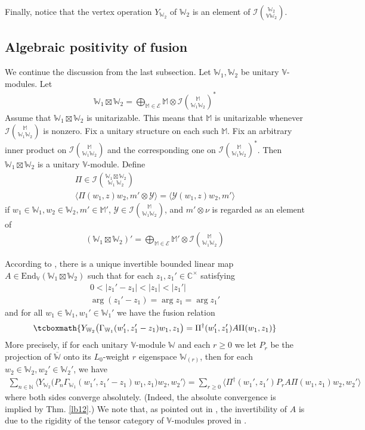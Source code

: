 \documentclass[11pt,b5paper,notitlepage]{article}
\theoremstyle{definition}
\theoremstyle{plain}
\newcommand{\mc}{\mathcal}
\newcommand{\ovl}{\overline}
\newcommand{\End}{\mathrm{End}} %
\newcommand{\bk}[1]{\langle {#1}\rangle}
\newcommand{\bigbk}[1]{\big\langle {#1}\big\rangle}
\newcommand{\Vbb}{\mathbb V}
\newcommand{\Wbb}{\mathbb W}
\newcommand{\Mbb}{\mathbb M}
\newcommand{\Cbb}{\mathbb C}
\newcommand{\Nbb}{\mathbb N}
\numberwithin{equation}{section}
\begin{document}
Finally, notice that the vertex operation $Y_{\Wbb_2}$ of $\Wbb_2$ is an element of $\mc I{\Wbb_2\choose \Vbb\Wbb_2}$.


\subsection{Algebraic positivity of fusion}


We continue the discussion from the last subsection. Let $\Wbb_1,\Wbb_2$ be unitary $\Vbb$-modules. Let
\begin{align*}
\Wbb_1\boxtimes\Wbb_2=\bigoplus_{\Mbb\in\mc E}\Mbb\otimes\mc I{\Mbb\choose\Wbb_1\Wbb_2}^*
\end{align*}
Assume that $\Wbb_1\boxtimes\Wbb_2$ is unitarizable. This means that $\Mbb$ is unitarizable whenever $\mc I{\Mbb\choose\Wbb_1\Wbb_2}$ is nonzero. Fix a unitary structure on each such $\Mbb$. Fix an arbitrary inner product on $\mc I{\Mbb\choose\Wbb_1\Wbb_2}$ and the corresponding one on $\mc I{\Mbb\choose\Wbb_1\Wbb_2}^*$. Then $\Wbb_1\boxtimes\Wbb_2$ is a unitary $\Vbb$-module. Define
\begin{gather*}
\Pi\in\mc I{\Wbb_1\boxtimes\Wbb_2\choose\Wbb_1~\Wbb_2}\\[0.5ex]
\bk{\Pi(w_1,z)w_2,m'\otimes\mc Y}=\bk{\mc Y(w_1,z)w_2,m'}
\end{gather*}
if $w_1\in\Wbb_1,w_2\in\Wbb_2,m'\in\Mbb'$, $\mc Y\in\mc I{\Mbb\choose\Wbb_1\Wbb_2}$, and $m'\otimes\nu$ is regarded as an element of
\begin{align*}
(\Wbb_1\boxtimes\Wbb_2)'=\bigoplus_{\Mbb\in\mc E}\Mbb'\otimes\mc I{\Mbb\choose\Wbb_1\Wbb_2}
\end{align*}

According to \cite[Chapter 6]{Gui19b}, there is a unique invertible bounded linear map $A\in\End_\Vbb(\Wbb_1\boxtimes\Wbb_2)$ such that for each $z_1,z_1'\in\Cbb^\times$ satisfying
\begin{subequations}
\begin{gather}
0<|z_1'-z_1|<|z_1|<|z_1'|   \label{eq70}\\ 
\arg (z_1'-z_1)=\arg z_1=\arg z_1'   \label{eq71}
\end{gather}
\end{subequations}
and for all $w_1\in\Wbb_1,w_1'\in\Wbb_1'$ we have the fusion relation
\begin{align}
\tcboxmath{Y_{\Wbb_2}\big(\Gamma_{\Wbb_1}(w_1',z_1'-z_1)w_1,z_1 \big)=\Pi^\dagger(w_1',z_1') A\Pi(w_1,z_1)}   \label{eq69}
\end{align}
More precisely, if for each unitary $\Vbb$-module $\Wbb$ and each $r\geq 0$ we let $P_r$ be the projection of $\ovl{\Wbb}$ onto its $L_0$-weight $r$ eigenspace $\Wbb_{(r)}$, then for each $w_2\in\Wbb_2,w_2'\in\Wbb_2'$, we have
\begin{align*}
\sum_{n\in\Nbb}\bigbk{Y_{\Wbb_2}\big(P_n\Gamma_{\Wbb_1}(w_1',z_1'-z_1)w_1,z_1 \big)w_2,w_2' }=\sum_{r\geq 0}\bigbk{\Pi^\dagger(w_1',z_1')P_r A\Pi(w_1,z_1)w_2,w_2'}
\end{align*}
where both sides converge absolutely. (Indeed, the absolute convergence is implied by Thm. \ref{lb12}.) We note that, as pointed out in \cite{Gui19b},  the invertibility of $A$ is due to the rigidity of the tensor category of $\Vbb$-modules proved in \cite{Hua08}.
\end{document}
